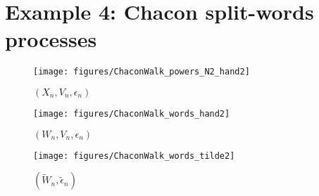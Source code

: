 \documentclass[12pt,a4paper]{article}
\begin{document}
\section{Example 4: Chacon split-words processes}


\begin{figure}[!h]
\centering
	\texttt{[image: figures/ChaconWalk\_powers\_N2\_hand2]}
\caption{$(X_n, V_n, \epsilon_n)$}
\label{fig:ChaconPowers}
\end{figure}


\begin{figure}[!h]
\centering
	\texttt{[image: figures/ChaconWalk\_words\_hand2]}
\caption{$(W_n, V_n, \epsilon_n)$}
\label{fig:Wn}
\end{figure}



\begin{figure}[!h]
\centering
	\texttt{[image: figures/ChaconWalk\_words\_tilde2]}
\caption{$(\widetilde{W}_n, \widetilde{\epsilon}_n)$}
\label{fig:tildeWn}
\end{figure}
\end{document}
